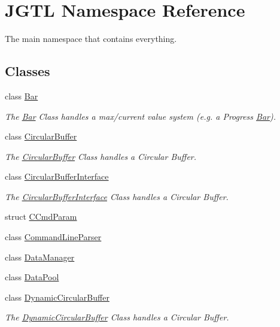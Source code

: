 \hypertarget{namespace_j_g_t_l}{
\section{JGTL Namespace Reference}
\label{namespace_j_g_t_l}
}
The main namespace that contains everything.  


\subsection*{Classes}
\begin{CompactItemize}
\item 
class \hyperlink{class_j_g_t_l_1_1_bar}{Bar}
\begin{CompactList}\small\item\em The \hyperlink{class_j_g_t_l_1_1_bar}{Bar} Class handles a max/current value system (e.g. a Progress \hyperlink{class_j_g_t_l_1_1_bar}{Bar}). \item\end{CompactList}\item 
class \hyperlink{class_j_g_t_l_1_1_circular_buffer}{Circular\-Buffer}
\begin{CompactList}\small\item\em The \hyperlink{class_j_g_t_l_1_1_circular_buffer}{Circular\-Buffer} Class handles a Circular Buffer. \item\end{CompactList}\item 
class \hyperlink{class_j_g_t_l_1_1_circular_buffer_interface}{Circular\-Buffer\-Interface}
\begin{CompactList}\small\item\em The \hyperlink{class_j_g_t_l_1_1_circular_buffer_interface}{Circular\-Buffer\-Interface} Class handles a Circular Buffer. \item\end{CompactList}\item 
struct \hyperlink{struct_j_g_t_l_1_1_c_cmd_param}{CCmd\-Param}
\item 
class \hyperlink{class_j_g_t_l_1_1_command_line_parser}{Command\-Line\-Parser}
\item 
class \hyperlink{class_j_g_t_l_1_1_data_manager}{Data\-Manager}
\item 
class \hyperlink{class_j_g_t_l_1_1_data_pool}{Data\-Pool}
\item 
class \hyperlink{class_j_g_t_l_1_1_dynamic_circular_buffer}{Dynamic\-Circular\-Buffer}
\begin{CompactList}\small\item\em The \hyperlink{class_j_g_t_l_1_1_dynamic_circular_buffer}{Dynamic\-Circular\-Buffer} Class handles a Circular Buffer. \item\end{CompactList}\item 

\end{CompactItemize}
